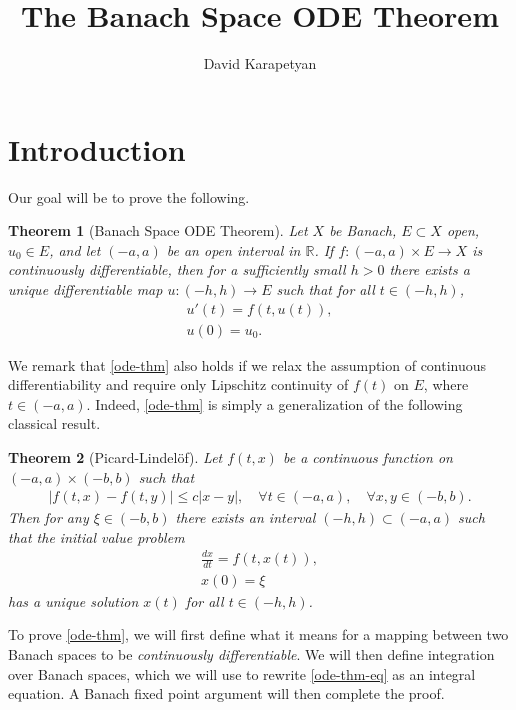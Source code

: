 \documentclass[12pt,reqno]{amsart}
\numberwithin{equation}{section}  %
\numberwithin{figure}{section}
\newcommand{\rr}{\mathbb{R}}
\theoremstyle{plain}
\newtheorem{theorem}{Theorem}
\theoremstyle{definition}
\theoremstyle{remark}
\begin{document}
\title{The Banach Space ODE Theorem}
\author{David Karapetyan}
\address{Department of Mathematics  \\
	University  of Notre Dame\\
		Notre Dame, IN 46556 }
		\date{}
		\maketitle
%
%
\section{Introduction}
Our goal will be to prove the following.
%
%
%
%
%
%
%
%
\begin{theorem}[Banach Space ODE Theorem]
	\label{ode-thm}
	Let $X$ be Banach, $E \subset X$ open, $u_0 \in E$, and let $(-a, a)$ be an
	open interval in $\rr$. If $f: (-a, a) \times E \to X$ is \emph{continuously
	differentiable}, then for a sufficiently small $h > 0$ there exists a unique
	differentiable map $u: (-h, h) \to E$ such that for all $t \in (-h, h)$,
	\begin{gather}
		\label{ode-thm-eq}
			u'(t) = f(t, u(t)),
			\\
			\label{ode-thm-init-data}
			u(0) = u_0.
	\end{gather}
\end{theorem}
%
%
We remark that \autoref{ode-thm} also holds if we relax the assumption of continuous
differentiability and require only Lipschitz continuity of $f(t)$ on $E$, where $t
\in (-a, a)$. 
Indeed, \autoref{ode-thm} is simply a 
generalization of the following classical result.
%
%
%
%
%
%
%
%
\begin{theorem}[Picard-Lindel\"{o}f]
	Let $f(t, x)$ be a continuous function on $(- a, a) \times (- b,
	b)$ such that
	\begin{equation*}
		\begin{split}
			| f(t, x) - f(t, y) | \le c| x - y |, \quad \forall t \in (-a, a),
			\quad \forall x,y \in (- b, b).
		\end{split}
	\end{equation*}
	Then for any $\xi \in (-b, b)$ there exists an interval $(-h, h)
	\subset (-a, a)$ such that the initial value problem
	\begin{gather}
			\frac{dx}{dt} = f(t, x(t)),
			\\
			x(0) = \xi 
	\end{gather}
	has a unique solution $x(t)$ for all $t \in (-h, h)$.
	\end{theorem}
To prove \autoref{ode-thm}, we will first define what it means for a 
mapping between two Banach spaces to be \emph{continuously differentiable}.
We will then define integration over Banach spaces, which we will use to
rewrite \eqref{ode-thm-eq} as an integral equation. A Banach fixed point
argument will then complete the proof. 
%
%
%
%
%
%
%
%
\end{document}
